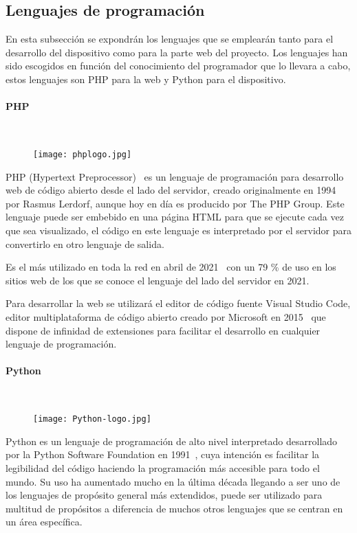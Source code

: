 \subsection{Lenguajes de programación}\label{subsec:lenguajes}
En esta subsección se expondrán los lenguajes que se emplearán tanto para el desarrollo del dispositivo como para la parte web del proyecto. Los lenguajes han sido escogidos en función del conocimiento del programador que lo llevara a cabo, estos lenguajes son PHP para la web y Python para el dispositivo.

\paragraph{PHP}\mbox{} \\
\begin{figure}[H]
	{\texttt{[image: phplogo.jpg]}}\label{fig:phpLogo}
\end{figure}
PHP (Hypertext Preprocessor)~\cite{welling_php_2003} es un lenguaje de programación para desarrollo web de código abierto desde el lado del servidor, creado originalmente en 1994 por Rasmus Lerdorf, aunque hoy en día es producido por The PHP Group. Este lenguaje puede ser embebido en una página HTML para que se ejecute cada vez que sea visualizado, el código en este lenguaje es interpretado por el servidor para convertirlo en otro lenguaje de salida.

Es el más utilizado en toda la red en abril de 2021~\cite{noauthor_usage_nodate} con un 79 \% de uso en los sitios web de los que se conoce el lenguaje del lado del servidor en 2021.

Para desarrollar la web se utilizará el editor de código fuente Visual Studio Code, editor multiplataforma de código abierto creado por Microsoft en 2015~\cite{noauthor_visual_2021} que dispone de infinidad de extensiones para facilitar el desarrollo en cualquier lenguaje de programación.

\paragraph{Python}\mbox{} \\
\begin{figure}[H]
	{\texttt{[image: Python-logo.jpg]}}\label{fig:logoPython}
\end{figure}
Python es un lenguaje de programación de alto nivel interpretado desarrollado por la Python Software Foundation en 1991~\cite{montoro_python_2012}, cuya intención es facilitar la legibilidad del código haciendo la programación más accesible para todo el mundo. Su uso ha aumentado mucho en la última década llegando a ser uno de los lenguajes de propósito general más extendidos, puede ser utilizado para multitud de propósitos a diferencia de muchos otros lenguajes que se centran en un área específica.

